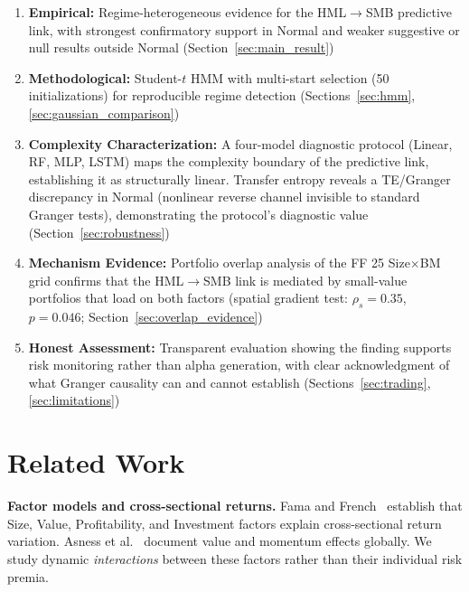 \documentclass{uai2026}
\begin{document}
\begin{enumerate}
    \item \textbf{Empirical:} Regime-heterogeneous evidence for the HML$\to$SMB
    predictive link, with strongest confirmatory support in Normal and weaker
    suggestive or null results outside Normal (Section~\ref{sec:main_result})

    \item \textbf{Methodological:} Student-$t$ HMM with multi-start selection
    (50 initializations) for reproducible regime detection
    (Sections~\ref{sec:hmm}, \ref{sec:gaussian_comparison})

    \item \textbf{Complexity Characterization:} A four-model diagnostic protocol
    (Linear, RF, MLP, LSTM) maps the complexity boundary of the predictive link,
    establishing it as structurally linear. Transfer entropy reveals a
    TE/Granger discrepancy in Normal (nonlinear reverse channel invisible to
    standard Granger tests), demonstrating the protocol's diagnostic value
    (Section~\ref{sec:robustness})

    \item \textbf{Mechanism Evidence:} Portfolio overlap analysis of the FF 25
    Size$\times$BM grid confirms that the HML$\to$SMB link is mediated by
    small-value portfolios that load on both factors (spatial gradient test:
    $\rho_s = 0.35$, $p = 0.046$; Section~\ref{sec:overlap_evidence})

    \item \textbf{Honest Assessment:} Transparent evaluation showing the finding
    supports risk monitoring rather than alpha generation, with clear acknowledgment
    of what Granger causality can and cannot establish
    (Sections~\ref{sec:trading}, \ref{sec:limitations})
\end{enumerate}

\section{Related Work}

\textbf{Factor models and cross-sectional returns.}
Fama and French~\cite{fama1993common,fama2015five} establish that Size, Value,
Profitability, and Investment factors explain cross-sectional return variation.
Asness et al.~\cite{asness2013value} document value and momentum effects globally.
We study dynamic \emph{interactions} between these factors rather than their
individual risk premia.
\end{document}
